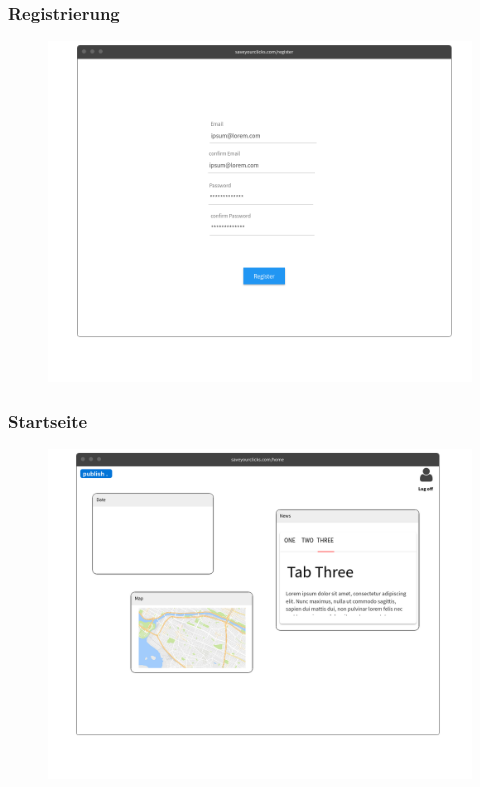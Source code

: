 		\subsubsection{Registrierung}
			\begin{figure}[H]
				\includegraphics[scale=0.4]{images/p1reg}
			\end{figure}
		
		\subsubsection{Startseite}
			\begin{figure}[H]
				\includegraphics[scale=0.4]{images/p2}
			\end{figure}
		
